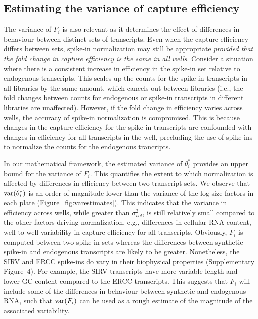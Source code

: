 \documentclass{article}
\newcommand{\suppfigbiophys}{4}
\begin{document}
\subsection{Estimating the variance of capture efficiency}
The variance of $F_i$ is also relevant as it determines the effect of differences in behaviour between distinct sets of transcripts.
Even when the capture efficiency differs between sets, spike-in normalization may still be appropriate \textit{provided that the fold change in capture efficiency is the same in all wells}.
Consider a situation where there is a consistent increase in efficiency in the spike-in set relative to endogenous transcripts.
This scales up the counts for the spike-in transcripts in all libraries by the same amount, which cancels out between libraries (i.e., the fold changes between counts for endogenous or spike-in transcripts in different libraries are unaffected).
However, if the fold change in efficiency varies across wells, the accuracy of spike-in normalization is compromised.
This is because changes in the capture efficiency for the spike-in transcripts are confounded with changes in efficiency for all transcripts in the well, precluding the use of spike-ins to normalize the counts for the endogenous trancripts.

In our mathematical framework, the estimated variance of $\theta^*_i$ provides an upper bound for the variance of $F_i$.
This quantifies the extent to which normalization is affected by differences in efficiency between two transcript sets.
We observe that $\mbox{var}(\theta^*_i)$ is an order of magnitude lower than the variance of the log-size factors in each plate (Figure~\ref{fig:varestimates}).
This indicates that the variance in efficiency across wells, while greater than $\sigma^2_{vol}$, is still relatively small compared to the other factors driving normalization, e.g., differences in cellular RNA content, well-to-well variability in capture efficiency for all transcripts.
Obviously, $F_i$ is computed between two spike-in sets whereas the differences between synthetic spike-in and endogenous transcripts are likely to be greater.
Nonetheless, the SIRV and ERCC spike-ins do vary in their biophysical properties (Supplementary Figure~\suppfigbiophys{}).
For example, the SIRV transcripts have more variable length and lower GC content compared to the ERCC transcripts.
This suggests that $F_i$ will include some of the differences in behaviour between synthetic and endogenous RNA, such that $\mbox{var}(F_i)$ can be used as a rough estimate of the magnitude of the associated variability.
\end{document}
